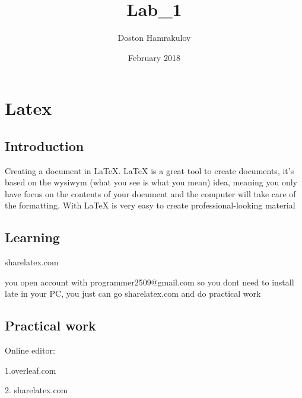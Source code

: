 \documentclass{article}
\title{Lab_1}
\author{Doston Hamrakulov }
\date{February 2018}
\begin{document}
\maketitle

\chapter{Latex}
\section{Introduction}

Creating a document in LaTeX. LaTeX is a great tool to create documents, it's based on the wysiwym (what you see is what you mean) idea, meaning you only have focus on the contents of your document and the computer will take care of the formatting. With LaTeX is very easy to create professional-looking material

\section{Learning}

sharelatex.com

you open account with programmer2509@gmail.com
so you dont need to install late in your PC, you just can go sharelatex.com and do practical work

\section{Practical work}


Online editor:

1.overleaf.com

2. sharelatex.com
\end{document}
